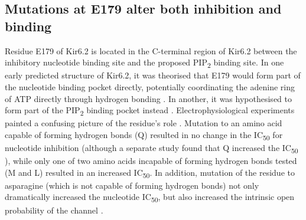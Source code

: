 \subsection{Mutations at E179 alter both inhibition and binding}

Residue E179 of Kir6.2 is located in the C-terminal region of Kir6.2 between the inhibitory nucleotide binding site and the proposed PIP\textsubscript{2} binding site.
In one early predicted structure of Kir6.2, it was theorised that E179 would form part of the nucleotide binding pocket directly, potentially coordinating the adenine ring of ATP directly through hydrogen bonding \cite{antcliff_functional_2005}.
In another, it was hypothesised to form part of the PIP\textsubscript{2} binding pocket instead \cite{haider_identification_2007}.
Electrophysiological experiments painted a confusing picture of the residue's role \cite{antcliff_functional_2005}.
Mutation to an amino acid capable of forming hydrogen bonds (Q) resulted in no change in the IC\textsubscript{50} for nucleotide inhibition (although a separate study found that Q increased the IC\textsubscript{50} \cite{proks_involvement_1999}), while only one of two amino acids incapable of forming hydrogen bonds tested (M and L) resulted in an increased IC\textsubscript{50}.
In addition, mutation of the residue to asparagine (which is not capable of forming hydrogen bonds) not only dramatically increased the nucleotide IC\textsubscript{50}, but also increased the intrinsic open probability of the channel \cite{antcliff_functional_2005}.

